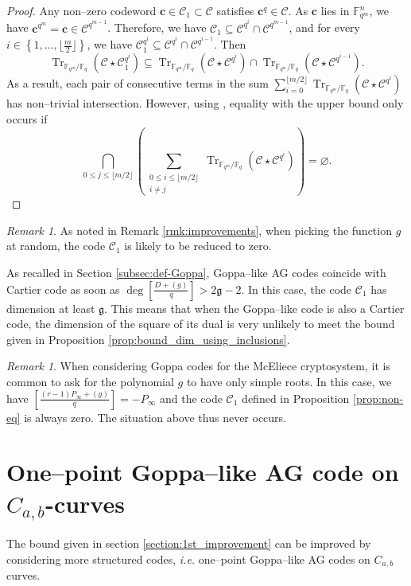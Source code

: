 \documentclass[a4paper]{amsart}
\theoremstyle{definition}
\theoremstyle{remark}
\newtheorem{remark}[thm]{Remark}
\newcommand{\calC}{\mathcal{C}}
\newcommand{\fqm}{\mathbb{F}_{q^m}}
\newcommand{\fq}{\mathbb{F}_{q}}
\newcommand{\Tr}[1]{\operatorname{Tr}_{\mathbb{F}_{q^m}/\fq}\left(#1\right)}
\newcommand{\set}[1]{\left\{#1\right\}}
\begin{document}
\begin{proof}
Any non--zero codeword $\mathbf{c} \in  \calC_1 \subset \calC$ satisfies $\mathbf{c}^q \in \calC$. As $\mathbf{c}$ lies in $\fqm^n$, we have $\mathbf{c}^{q^m}=\mathbf{c} \in \calC^{q^{m-1}}$. Therefore,  we have $\calC_1 \subseteq \calC^{q^i} \cap \calC^{q^{m-1}}$, and for every $i \in \set{1,\dots,\lfloor \frac{m}{2}\rfloor}$, we have $\calC_1^{q^i} \subseteq \calC^{q^i} \cap \calC^{q^{i-1}}$. Then
\[\Tr{\calC\star\calC_1^{q^i}} \subseteq \Tr{\calC\star\calC^{q^i}} \cap \Tr{\calC\star\calC^{q^{i-1}}}.\]
As a result, each pair of consecutive terms in the sum $\sum\limits_{i=0}^{\lfloor m/2 \rfloor} \Tr{\calC \star \calC^{q^i}}$ has non--trivial intersection. However, using \cite[Theorem~2]{T19}, equality with the upper bound only occurs if
\[\bigcap_{0\leq j \leq \lfloor m/2\rfloor} \left( \sum_{\substack{0\leq i \leq \lfloor m/2 \rfloor\\ i\neq j}} \Tr{\calC \star \calC^{q^i}} \right)= \varnothing.\]
\end{proof}

\begin{remark}
	As noted in Remark \ref{rmk:improvements}, when picking the function $g$ at random, the code $\calC_1$ is likely to be reduced to zero.
\end{remark}

As recalled in Section \ref{subsec:def-Goppa}, Goppa--like AG codes coincide with Cartier code as soon as $\deg \left[ \frac{D+(g)}{q} \right] > 2 \mathfrak{g}-2$. In this case, the code $\calC_1$ has dimension at least $\mathfrak{g}$. This means that when the Goppa--like code is also a Cartier code, the dimension of the square of its dual is very unlikely to meet the bound given in Proposition \ref{prop:bound_dim_using_inclusions}.

\begin{remark}
	When considering Goppa codes for the McEliece cryptosystem, it is common to ask for the polynomial $g$ to have only simple roots. In this case, we have $ \left[ \frac{(r-1)P_\infty+(g)}{q} \right] = -P_\infty$ and the code $\calC_1$ defined in Proposition \ref{prop:non-eq} is always zero. The situation above thus never occurs.
\end{remark}

\section{One--point Goppa--like AG code on $C_{a,b}$-curves}\label{sec:AG-C_a,b}
The bound given in section \ref{section:1st_improvement} can be improved by considering more structured codes, \emph{i.e.} one--point Goppa--like AG codes on $C_{a,b}$ curves.
\end{document}
